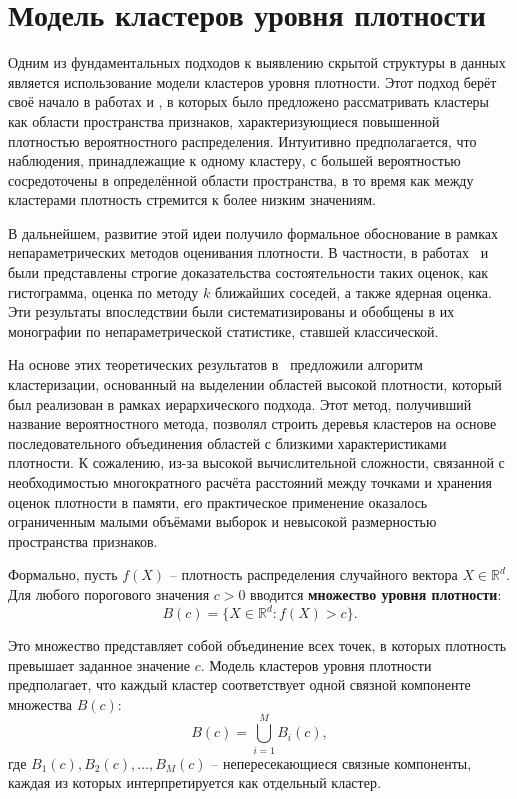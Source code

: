\section{Модель кластеров уровня плотности}

Одним из фундаментальных подходов к выявлению скрытой структуры в данных является использование модели кластеров уровня плотности. Этот подход берёт своё начало в работах \cite{bock1974automatische} и \cite{hartigan1975clustering}, в которых было предложено рассматривать кластеры как области пространства признаков, характеризующиеся повышенной плотностью вероятностного распределения. Интуитивно предполагается, что наблюдения, принадлежащие к одному кластеру, с большей вероятностью сосредоточены в определённой области пространства, в то время как между кластерами плотность стремится к более низким значениям.

В дальнейшем, развитие этой идеи получило формальное обоснование в рамках непараметрических методов оценивания плотности. В частности, в работах~\cite{devroye1980strong} и \cite{devroye1977strong} были представлены строгие доказательства состоятельности таких оценок, как гистограмма, оценка по методу \(k\) ближайших соседей, а также ядерная оценка. Эти результаты впоследствии были систематизированы и обобщены в их монографии по непараметрической статистике, ставшей классической.

На основе этих теоретических результатов в~\cite{wong1983kth} предложили алгоритм кластеризации, основанный на выделении областей высокой плотности, который был реализован в рамках иерархического подхода. Этот метод, получивший название вероятностного метода, позволял строить деревья кластеров на основе последовательного объединения областей с близкими характеристиками плотности. К сожалению, из-за высокой вычислительной сложности, связанной с необходимостью многократного расчёта расстояний между точками и хранения оценок плотности в памяти, его практическое применение оказалось ограниченным малыми объёмами выборок и невысокой размерностью пространства признаков.

Формально, пусть \(f(X)\) -- плотность распределения случайного вектора \(X \in \mathbb{R}^d\). Для любого порогового значения \(c > 0\) вводится \textbf{множество уровня плотности}:
\[
B(c) = \{X \in \mathbb{R}^d : f(X) > c\}.
\]

Это множество представляет собой объединение всех точек, в которых плотность превышает заданное значение \(c\). Модель кластеров уровня плотности предполагает, что каждый кластер соответствует одной связной компоненте множества \(B(c)\):
\[
B(c) = \bigcup_{i=1}^M B_i(c),
\]
где \(B_1(c), B_2(c), \dots, B_M(c)\) -- непересекающиеся связные компоненты, каждая из которых интерпретируется как отдельный кластер.

